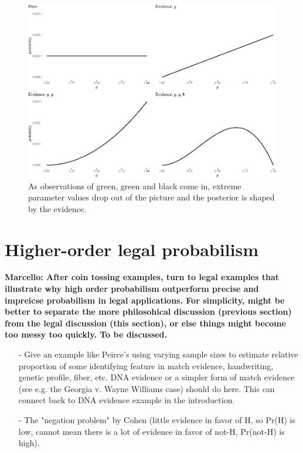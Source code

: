 \documentclass[
  10pt,
  dvipsnames,enabledeprecatedfontcommands]{scrartcl}
\begin{document}
\begin{figure}[H]

\begin{center}\includegraphics[width=1\linewidth]{chapter-outline_files/figure-latex/fig:inertia2-1} \end{center}
\caption{As observations of green, green and black come in, extreme parameter values drop out of the picture and the posterior is shaped by the evidence.}
\label{fig:intertia2}
\end{figure}

\hypertarget{higher-order-legal-probabilism}{%
\section{Higher-order legal
probabilism}\label{higher-order-legal-probabilism}}

\textbf{Marcello: After coin tossing examples, turn to legal examples that illustrate why high order probabilism outperform precise and impreicse probabilism in legal applications. For simplicity, might be better to separate the more philosohical discussion (previous section) from the legal discussion (this section), or else  things might become too messy too quickly. To be discussed.}

\begin{itemize}



\item[-] Give an example like Peirce's using varying sample sizes to estimate relative proportion of some identifying feature in match evidence, handwriting, genetic profile, fiber, etc. DNA evidence or a simpler form of match evidence (see e.g. the Georgia v. Wayne Williams case) should do here. This can connect back to DNA evidence example in the introduction.



\item[-] The "negation problem" by Cohen (little evidence in favor of H, so Pr(H) is low, cannot mean there is a lot of evidence in favor of not-H, Pr(not-H) is high). 

\end{itemize}
\end{document}
